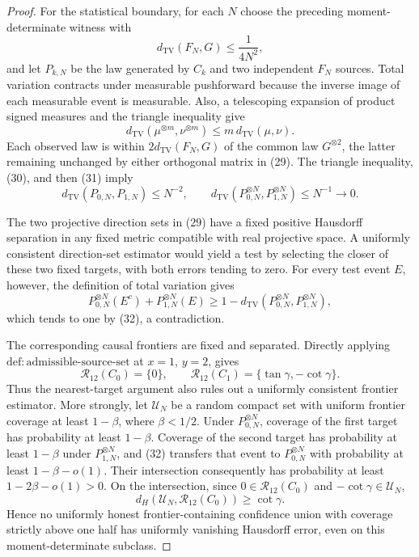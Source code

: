 \documentclass{article}
\begin{document}
\begin{proof}
For the statistical boundary, for each \(N\) choose the preceding moment-determinate witness with
\[
 d_{\mathrm{TV}}(F_N,G)\le\frac{1}{4N^2}, \tag{30}
\]
and let \(P_{k,N}\) be the law generated by \(C_k\) and two independent \(F_N\) sources. Total variation contracts under measurable pushforward because the inverse image of each measurable event is measurable. Also, a telescoping expansion of product signed measures and the triangle inequality give
\[
 d_{\mathrm{TV}}(\mu^{\otimes m},\nu^{\otimes m})
 \le m\,d_{\mathrm{TV}}(\mu,\nu). \tag{31}
\]
Each observed law is within \(2d_{\mathrm{TV}}(F_N,G)\) of the common law \(G^{\otimes2}\), the latter remaining unchanged by either orthogonal matrix in (29). The triangle inequality, (30), and then (31) imply
\[
 d_{\mathrm{TV}}(P_{0,N},P_{1,N})\le N^{-2},
 \qquad
 d_{\mathrm{TV}}(P_{0,N}^{\otimes N},P_{1,N}^{\otimes N})\le N^{-1}\longrightarrow0. \tag{32}
\]

The two projective direction sets in (29) have a fixed positive Hausdorff separation in any fixed metric compatible with real projective space. A uniformly consistent direction-set estimator would yield a test by selecting the closer of these two fixed targets, with both errors tending to zero. For every test event \(E\), however, the definition of total variation gives
\[
 P_{0,N}^{\otimes N}(E^c)+P_{1,N}^{\otimes N}(E)
 \ge1-d_{\mathrm{TV}}(P_{0,N}^{\otimes N},P_{1,N}^{\otimes N}), \tag{33}
\]
which tends to one by (32), a contradiction.

The corresponding causal frontiers are fixed and separated. Directly applying \(\mathrm{def{:}admissible\text{-}source\text{-}set}\) at \(x=1\), \(y=2\), gives
\[
 \mathcal R_{12}(C_0)=\{0\},
 \qquad
 \mathcal R_{12}(C_1)=\{\tan\gamma,-\cot\gamma\}. \tag{34}
\]
Thus the nearest-target argument also rules out a uniformly consistent frontier estimator. More strongly, let \(\mathcal U_N\) be a random compact set with uniform frontier coverage at least \(1-\beta\), where \(\beta<1/2\). Under \(P_{0,N}^{\otimes N}\), coverage of the first target has probability at least \(1-\beta\). Coverage of the second target has probability at least \(1-\beta\) under \(P_{1,N}^{\otimes N}\), and (32) transfers that event to \(P_{0,N}^{\otimes N}\) with probability at least \(1-\beta-o(1)\). Their intersection consequently has probability at least \(1-2\beta-o(1)>0\). On the intersection, since \(0\in\mathcal R_{12}(C_0)\) and \(-\cot\gamma\in\mathcal U_N\),
\[
 d_H(\mathcal U_N,\mathcal R_{12}(C_0))\ge\cot\gamma. \tag{35}
\]
Hence no uniformly honest frontier-containing confidence union with coverage strictly above one half has uniformly vanishing Hausdorff error, even on this moment-determinate subclass.


\end{proof}
\end{document}
